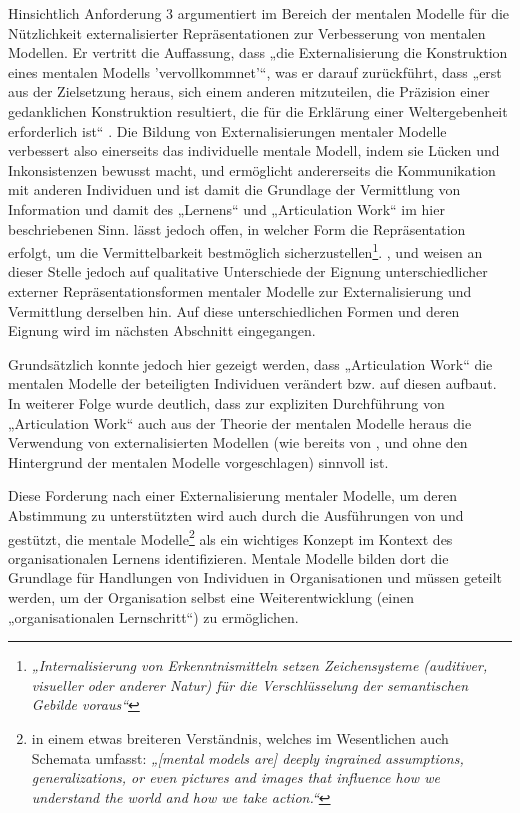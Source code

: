 Hinsichtlich Anforderung 3 argumentiert \citet{Seel91} im Bereich der mentalen Modelle für die Nützlichkeit externalisierter Repräsentationen zur Verbesserung von mentalen Modellen. Er vertritt die Auffassung, dass „die Externalisierung die Konstruktion eines mentalen Modells 'vervollkommnet'“, was er darauf zurückführt, dass „erst aus der Zielsetzung heraus, sich einem anderen mitzuteilen, die Präzision einer gedanklichen Konstruktion resultiert, die für die Erklärung einer Weltergebenheit erforderlich ist“ \citep[][S. 155]{Seel91}. Die Bildung von Externalisierungen mentaler Modelle verbessert also einerseits das individuelle mentale Modell, indem sie Lücken und Inkonsistenzen bewusst macht, und ermöglicht andererseits die Kommunikation mit anderen Individuen und ist damit die Grundlage der Vermittlung von Information und damit des „Lernens“ und „Articulation Work“ im hier beschriebenen Sinn. \citet{Seel91} lässt jedoch offen, in welcher Form die Repräsentation erfolgt, um die Vermittelbarkeit bestmöglich sicherzustellen\footnote{\emph{„Internalisierung von Erkenntnismitteln setzen Zeichensysteme (auditiver, visueller oder anderer Natur) für die Verschlüsselung der semantischen Gebilde voraus“}\citep[][S. 155]{Seel91}}. \citet{Ifenthaler06}, \citet{Hanke06} und \citet{Pirnay-Dummer06} weisen an dieser Stelle jedoch auf qualitative Unterschiede der Eignung unterschiedlicher externer Repräsentationsformen mentaler Modelle zur Externalisierung und Vermittlung derselben hin. Auf diese unterschiedlichen Formen und deren Eignung wird im nächsten Abschnitt eingegangen. 

Grundsätzlich konnte jedoch hier gezeigt werden, dass „Articulation Work“ die mentalen Modelle der beteiligten Individuen verändert bzw. auf diesen aufbaut. In weiterer Folge wurde deutlich, dass zur expliziten Durchführung von „Articulation Work“ auch aus der Theorie der mentalen Modelle heraus die Verwendung von externalisierten Modellen (wie bereits von \citet{Divitini00}, \citet{Herrmann02} und \citet{Jorgensen04} ohne den Hintergrund der mentalen Modelle vorgeschlagen) sinnvoll ist.

Diese Forderung nach einer Externalisierung mentaler Modelle, um deren Abstimmung zu unterstützten wird auch durch die Ausführungen von \citet{Senge90} und \citet{Kim93} gestützt, die mentale Modelle\footnote{in einem etwas breiteren Verständnis, welches im Wesentlichen auch Schemata umfasst: \emph{„[mental models are] deeply ingrained assumptions, generalizations, or even pictures and images that influence how we understand the world and how we take action.“}\citet{Senge90}} als ein wichtiges Konzept im Kontext des organisationalen Lernens identifizieren. Mentale Modelle bilden dort die Grundlage für Handlungen von Individuen in Organisationen und müssen geteilt werden, um der Organisation selbst eine Weiterentwicklung (einen „organisationalen Lernschritt“) zu ermöglichen.

